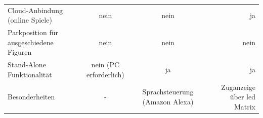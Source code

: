 \begin{longtable}[]{@{}lccr@{}}
\begin{minipage}[t]{0.19\columnwidth}
Cloud-Anbindung (online Spiele)\strut
\end{minipage} & \begin{minipage}[t]{0.25\columnwidth}\centering
nein\strut
\end{minipage} & \begin{minipage}[t]{0.26\columnwidth}\centering
nein\strut
\end{minipage} & \begin{minipage}[t]{0.19\columnwidth}\raggedleft
ja\strut
\end{minipage}\tabularnewline
\begin{minipage}[t]{0.19\columnwidth}\raggedright
Parkposition für ausgeschiedene Figuren\strut
\end{minipage} & \begin{minipage}[t]{0.25\columnwidth}\centering
nein\strut
\end{minipage} & \begin{minipage}[t]{0.26\columnwidth}\centering
nein\strut
\end{minipage} & \begin{minipage}[t]{0.19\columnwidth}\raggedleft
nein\strut
\end{minipage}\tabularnewline
\begin{minipage}[t]{0.19\columnwidth}\raggedright
Stand-Alone Funktionalität\strut
\end{minipage} & \begin{minipage}[t]{0.25\columnwidth}\centering
nein (PC erforderlich)\strut
\end{minipage} & \begin{minipage}[t]{0.26\columnwidth}\centering
ja\strut
\end{minipage} & \begin{minipage}[t]{0.19\columnwidth}\raggedleft
ja\strut
\end{minipage}\tabularnewline
\begin{minipage}[t]{0.19\columnwidth}\raggedright
Besonderheiten\strut
\end{minipage} & \begin{minipage}[t]{0.25\columnwidth}\centering
-\strut
\end{minipage} & \begin{minipage}[t]{0.26\columnwidth}\centering
Sprachsteuerung (Amazon Alexa)\strut
\end{minipage} & \begin{minipage}[t]{0.19\columnwidth}\raggedleft
Zuganzeige über \gls{led} Matrix\strut
\end{minipage}\tabularnewline

\end{longtable}
